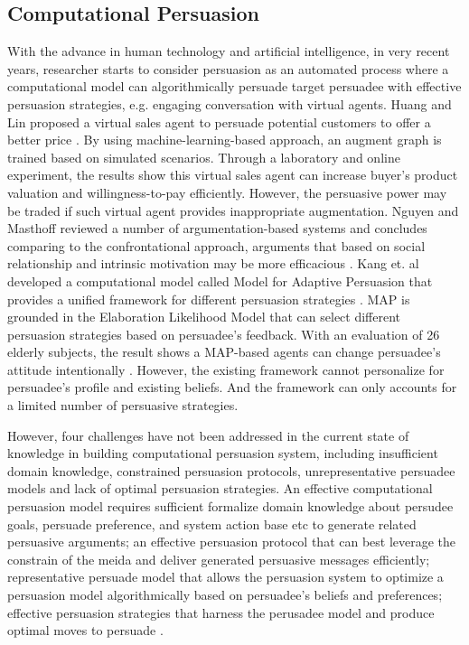 \subsection{Computational Persuasion}
With the advance in human technology and artificial intelligence, in very recent years, researcher starts to consider persuasion as an automated process where a computational model can algorithmically persuade target persuadee with effective persuasion strategies, e.g. engaging conversation with virtual agents\cite{huang2007design,nguyen2008designing,KangT15}. Huang and Lin proposed a virtual sales agent to persuade potential customers to offer a better price \cite{huang2007design}. By using machine-learning-based approach, an augment graph is trained based on simulated scenarios. Through a laboratory and online experiment, the results show this virtual sales agent can increase buyer's product valuation and willingness-to-pay efficiently. However, the persuasive power may be traded if such virtual agent provides inappropriate augmentation. Nguyen and Masthoff reviewed a number of argumentation-based systems and concludes comparing to the confrontational approach, arguments that based on social relationship and intrinsic motivation may be more efficacious \cite{nguyen2008designing}. Kang et. al developed a computational model called Model for Adaptive Persuasion that provides a unified framework for different persuasion strategies \cite{KangT15}. MAP is grounded in the Elaboration Likelihood Model that can select different persuasion strategies based on persuadee's feedback. With an evaluation of 26 elderly subjects, the result shows a MAP-based agents can change persuadee's attitude intentionally \cite{KangT15}. However, the existing framework cannot personalize for persuadee's profile and existing beliefs. And the framework can only accounts for a limited number of persuasive strategies.\par
However, four challenges have not been addressed in the current state of knowledge in building computational persuasion system, including insufficient domain knowledge, constrained persuasion protocols, unrepresentative persuadee models and lack of optimal persuasion strategies\cite{huntertowards}. An effective computational persuasion model requires sufficient formalize domain knowledge about persudee goals, persuade preference, and system action base etc to generate related persuasive arguments; an effective persuasion protocol that can best leverage the constrain of the meida and deliver generated persuasive messages efficiently; representative persuade model that allows the persuasion system to optimize a persuasion model algorithmically based on persuadee's beliefs and preferences; effective persuasion strategies that harness the perusadee model and produce optimal moves to persuade \cite{huntertowards}. \par
